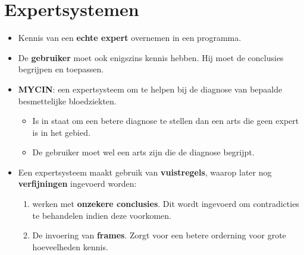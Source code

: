 \chapter{Expertsystemen}
\begin{itemize}
	\item Kennis van een \textbf{echte expert} overnemen in een programma.
	\item De \textbf{gebruiker} moet ook enigszins kennis hebben. Hij moet de conclusies begrijpen en toepassen.
	\item \textbf{MYCIN}: een expertsysteem om te helpen bij de diagnose van bepaalde besmettelijke bloedziekten.
	\begin{itemize}
		\item Is in staat om een betere diagnose te stellen dan een arts die geen expert is in het gebied.
		\item De gebruiker moet wel een arts zijn die de diagnose begrijpt.
	\end{itemize}
	\item Een expertsysteem maakt gebruik van \textbf{vuistregels}, waarop later nog \textbf{verfijningen} ingevoerd worden:
	\begin{enumerate}
		\item werken met \textbf{onzekere conclusies}. Dit wordt ingevoerd om contradicties te behandelen indien deze voorkomen.
		\item De invoering van \textbf{frames}. Zorgt voor een betere orderning voor grote hoeveelheden kennis.
	\end{enumerate}
\end{itemize}
